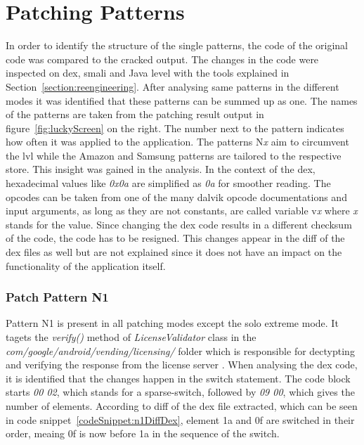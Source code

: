 \section{Patching Patterns} \label{section:luckypatcher-patterns}
In order to identify the structure of the single patterns, the code of the original code was compared to the cracked output.
The changes in the code were inspected on dex, smali and Java level with the tools explained in Section~\ref{section:reengineering}.
After analysing same patterns in the different modes it was identified that these patterns can be summed up as one.
\newline
The names of the patterns are taken from the patching result output in figure~\ref{fig:luckyScreen} on the right.
The number next to the pattern indicates how often it was applied to the application.
The patterns N\textit{x} aim to circumvent the \gls{lvl} while the Amazon and Samsung patterns are tailored to the respective store.
This insight was gained in the analysis.
In the context of the \gls{dex}, hexadecimal values like \textit{0x0a} are simplified as \textit{0a} for smoother reading.
The opcodes can be taken from one of the many dalvik opcode documentations \cite{opcodes} and input arguments, as long as they are not constants, are called variable v\textit{x} where \textit{x} stands for the value.
Since changing the dex code results in a different checksum of the code, the code has to be resigned.
This changes appear in the diff of the dex files as well but are not explained since it does not have an impact on the functionality of the application itself.

\subsubsection{Patch Pattern N1}
Pattern N1 is present in all patching modes except the solo extreme mode.
It tagets the \textit{verify()} method of \textit{LicenseValidator} class in the \textit{com/google/android/vending/licensing/} folder which is responsible for dectypting and verifying the response from the license server \cite{developersLicensingReference}.
\newline
When analysing the dex code, it is identified that the changes happen in the switch statement.
The code block starts \textit{00 02}, which stands for a sparse-switch, followed by \textit{09 00}, which gives the number of elements.
According to diff of the \gls{dex} file extracted, which can be seen in code snippet~\ref{codeSnippet:n1DiffDex}, element 1a and 0f are switched in their order, meaing 0f is now before 1a in the sequence of the switch.
\newline


